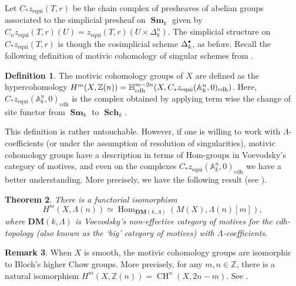 \documentclass[11pt]{article}
\numberwithin{equation}{section}
\newcommand{\sbullet}{{\scriptscriptstyle\bullet}}
\newcommand{\csbullet}{{\raisebox{1pt}{$\sbullet$}}}
\newcommand{\cdh}{\mathrm{cdh}}
\newcommand{\equi}{\mathrm{equi}}
\newtheorem{thm}{Theorem}[section]
\theoremstyle{definition}
\newtheorem{defn}[thm]{Definition}
\newtheorem{remk}[thm]{Remark}
\newcommand{\A}{{\mathbb A}}
\newcommand{\Z}{{\mathbb Z}}
\DeclareMathOperator{\CH}{CH}
\DeclareMathOperator{\Hom}{Hom}
\DeclareMathOperator{\Sch}{\mathbf{Sch}}
\DeclareMathOperator{\Sm}{\mathbf{Sm}}
\begin{document}
Let $C_{\ast}z_{\equi}(T,r)$ be the chain complex of
presheaves of abelian groups associated to
the simplicial presheaf on $\Sm_k$ given by
$C_nz_{\equi}(T,r)(U) = z_{\equi}(T,r)(U \times \Delta^n_k)$.
The simplicial structure on $C_{\ast}z_{\equi}(T,r)$
is though the cosimplicial scheme $\Delta^{\csbullet}_k$, as before.
Recall the following definition of motivic cohomology of singular schemes
from \cite[Def.\,9.2]{FV}.

\begin{defn}\label{defn:MC-sing}
The motivic cohomology groups of $X$ are defined as the
hypercohomology
$H^m(X, \Z(n)) = \H^{m-2n}_{\cdh}(X, C_{\ast}z_{\equi}(\A^n_k,0)_{\cdh})$. Here, $C_{\ast}z_{\equi}(\A^n_k,0)_{\cdh}$ is the complex obtained by applying term wise the change of site functor from $\Sm_k$ to $\Sch_k$.
\end{defn}

This definition is rather untouchable. However, if one is willing to work with $\Lambda$\nobreakdash-coefficients (or under the assumption of resolution of singularities), motivic cohomology groups have a description in terms of Hom-groups in Voevodsky's category of motives, and even on the complexes $C_{\ast}z_{\equi}(\A^n_k,0)_{\cdh}$ we have a better understanding. More precisely, we have the following result (see \cite[Th.\,3.10]{KP}).
\begin{thm} There is a functorial
isomorphism \[H^m(X, \Lambda(n)) \simeq \Hom_{\mathbf{DM}(k, \Lambda)}(M(X), \Lambda(n)[m]),\] where
$\mathbf{DM}(k, \Lambda)$ is Voevodsky's non-effective category of motives for the cdh-topology (also known as the `big' category of motives) with $\Lambda$-coefficients.
\end{thm}

\begin{remk}
When $X$ is smooth, the motivic cohomology groups are isomorphic to Bloch's higher Chow groups. More precisely, for any $m,n\in \Z$, there is a natural isomorphism $H^m(X, \Z(n)) = \CH^n(X, 2n-m)$. See
\cite[Cor. 2]{VoevHigherChow}.
\end{remk}
\end{document}
